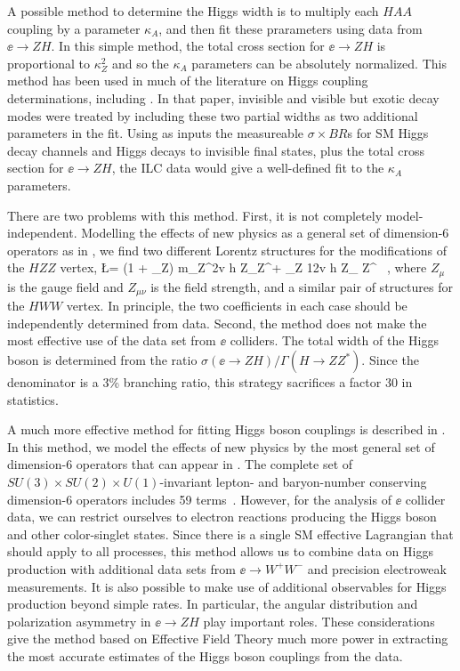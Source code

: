 A possible method to determine the Higgs width is to multiply each $HAA$ coupling by a parameter $\kappa_A$, and then fit these prarameters using data from $\ee\to ZH$.   In this simple method, the total cross section for $\ee\to ZH$ is proportional to $\kappa_Z^2$ and so the $\kappa_A$ parameters can be absolutely normalized.   This method has been used in much of the literature on Higgs coupling determinations, including \cite{Fujii:2015jha}.  In that paper, invisible and visible but exotic decay modes were treated by including these two partial widths as two additional parameters in the fit.  Using as inputs the measureable $\sigma\times BR$s for SM Higgs decay channels and Higgs decays to invisible final states, plus the total cross section for $\ee\to ZH$,  the ILC data would give a well-defined fit to the $\kappa_A$ parameters.

There are two problems with this method.  First, it is not completely model-independent.  Modelling the effects of new physics as a general set of dimension-6 operators as in , we find two different Lorentz structures for the modifications of the $HZZ$ vertex,
\beq
   \Delta \L =    (1 + \eta_Z) {m_Z^2\over v}  h Z_\mu Z^\mu + \zeta_Z {1\over 2v} h
   Z_{\mu\nu} Z^{\mu\nu} \ ,
where $Z_\mu$ is the gauge field and $Z_{\mu\nu}$ is the field strength, 
and a similar pair of structures for the $HWW$ vertex.  In principle, the two coefficients  in each case should be independently determined from data.  Second, the method does not make the most effective use of the data set from $\ee$ colliders.  The total width of the Higgs boson is determined from the ratio  $\sigma(\ee\to ZH)/\Gamma(H\to ZZ^*)$.  Since the denominator is a 3\% branching ratio, this strategy sacrifices a factor 30 in 
statistics.

A much more effective method for fitting Higgs boson couplings is described in \cite{Barklow:2017suo}.   In this method, we model the effects of new physics by the most general set of dimension-6 operators that can appear in .  The complete set of $SU(3)\times SU(2)\times U(1)$-invariant lepton- and baryon-number conserving dimension-6 operators  includes 59 terms~\cite{Grzadkowski:2010es}.  However, for 
the analysis of $\ee$ collider data, we can restrict ourselves to electron reactions 
producing the Higgs boson and other color-singlet states.  Since there is a single SM effective
 Lagrangian that should apply to all processes, this method allows us to combine data on 
Higgs production with additional data sets from $\ee\to W^+W^-$ and precision electroweak
measurements.   It is also possible to make use of additional observables for Higgs production
beyond simple rates.  In particular, the angular distribution and polarization asymmetry in 
$\ee\to ZH$ play important roles.  These considerations give the method based on 
Effective Field Theory much more power in extracting the most accurate estimates 
of the 
Higgs boson couplings from the data.

